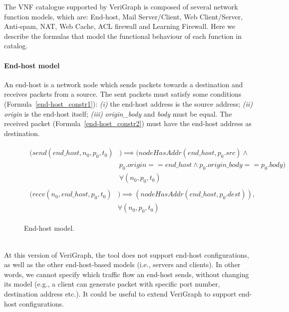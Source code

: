 
The VNF catalogue supported by VeriGraph is composed of several network function models, which are: End-host, Mail Server/Client, Web Client/Server, Anti-spam, NAT, Web Cache, ACL firewall and Learning Firewall. Here we describe the formulas that model the functional behaviour of each function in catalog.


\paragraph{End-host model}
An end-host is a network node which sends packets towards a destination and receives packets from a source. The sent packets must satisfy some conditions (Formula~\ref{end-host_constr1}): \textit{(i)} the end-host address is the source address; \textit{(ii)} \textit{origin} is the end-host itself; \textit{(iii)} \textit{origin\_body} and \textit{body}  must be equal. The received packet (Formula~\ref{end-host_constr2}) must have the end-host address as destination. 
\begin{figure}[h]
	{\footnotesize
		\begin{subequations}
			\begin{align}
				\begin{split}
					\label{end-host_constr1}
					(send(end\_host, n_{0}, p_{0}, t_{0}) &) \implies (nodeHasAddr(end\_host, p_{0}.src) \wedge \\
					& p_{0}.origin == end\_host \wedge p_{0}.origin\_body == p_{0}.body) \\
					& \forall (n_{0}, p_{0}, t_{0})
				\end{split} \\
				\begin{split}
					\label{end-host_constr2}
					(recv(n_{0}, end\_host, p_{0}, t_{0}) &) \implies (nodeHasAddr(end\_host, p_{0}.dest)),\\
					& \forall (n_{0}, p_{0}, t_{0})
				\end{split}
			\end{align}
		\end{subequations}
	}%
	\caption{End-host model.}
\end{figure}
\\
At this version of VeriGraph, the tool does not support end-host configurations, as well as the other end-host-based models (i.e., servers and clients). In other words, we cannot specify which traffic flow an end-host sends, without changing its model (e.g., a client can generate packet with specific port number, destination address etc.). It could be useful to extend VeriGraph to support end-host configurations.

